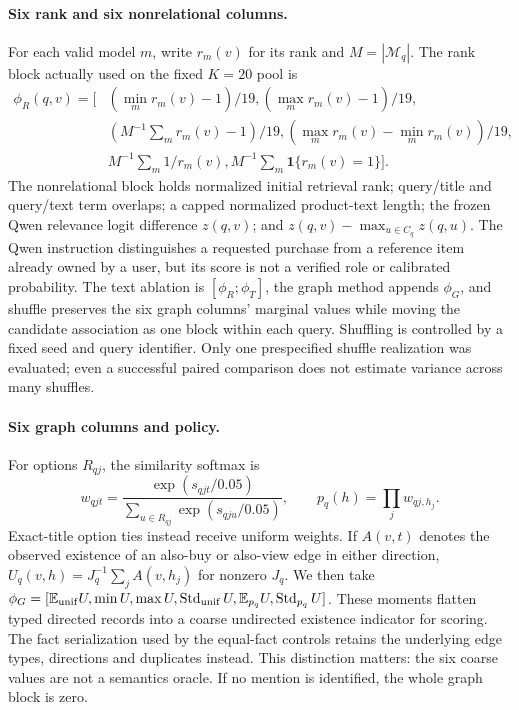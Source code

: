  \paragraph{Six rank and six nonrelational columns.}
 For each valid model $m$, write $r_m(v)$ for its rank and $M=|\mathcal M_q|$.
 The rank block actually used on the fixed $K=20$ pool is
 \begin{align}
 \phi_R(q,v)=\big[& (\min_m r_m(v)-1)/19,
  (\max_m r_m(v)-1)/19,\\
 & (M^{-1}\!\sum_m r_m(v)-1)/19,
  (\max_m r_m(v)-\min_m r_m(v))/19,\nonumber\\
 & M^{-1}\!\sum_m 1/r_m(v),
  M^{-1}\!\sum_m\mathbf{1}\{r_m(v)=1\}\big].\nonumber
 \end{align}
 The nonrelational block holds normalized initial retrieval rank;
 query/title and query/text term overlaps; a capped normalized product-text
 length; the frozen Qwen relevance logit difference $z(q,v)$; and
 $z(q,v)-\max_{u\in C_q}z(q,u)$. The Qwen instruction distinguishes a
 requested purchase from a reference item already owned by a user, but
 its score is not a verified role or calibrated probability. The text
 ablation is $[\phi_R;\phi_T]$, the graph method appends $\phi_G$,
 and shuffle preserves the six graph columns' marginal values while
 moving the candidate association as one block within each query.
 Shuffling is controlled by a fixed seed and query identifier. Only one
 prespecified shuffle realization was evaluated; even a successful
 paired comparison does not estimate variance across many shuffles.

 \paragraph{Six graph columns and policy.}
 For options $R_{qj}$, the similarity softmax is
 \begin{equation}
  w_{qjt}=\frac{\exp(s_{qjt}/0.05)}
  {\sum_{u\in R_{qj}}\exp(s_{qju}/0.05)},\qquad
  p_q(h)=\prod_jw_{qj,h_j}.
 \end{equation}
 Exact-title option ties instead receive uniform weights. If $A(v,t)$
 denotes the observed existence of an also-buy or also-view edge in
 either direction, $U_q(v,h)=J_q^{-1}\sum_j A(v,h_j)$ for nonzero $J_q$.
 We then take $\phi_G=[\mathbb E_{\rm unif} U,\min U,\max U,
 \operatorname{Std}_{\rm unif}U,\mathbb E_{p_q}U,
 \operatorname{Std}_{p_q}U]$. These moments flatten typed directed
 records into a coarse undirected existence indicator for scoring.
 The fact serialization used by the equal-fact controls retains the
 underlying edge types, directions and duplicates instead. This distinction
 matters: the six coarse values are not a semantics oracle. If no mention
 is identified, the whole graph block is zero.

